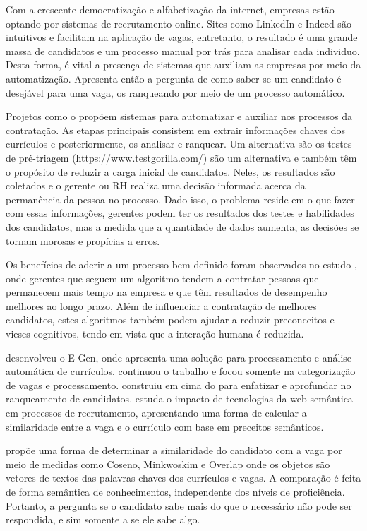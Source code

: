 \documentclass[preprint,12pt]{elsarticle}
\begin{document}
Com a crescente democratização e alfabetização da internet, empresas estão optando por sistemas de recrutamento online. Sites como LinkedIn e Indeed são intuitivos e facilitam na aplicação de vagas, entretanto, o resultado é uma grande massa de candidatos e um processo manual por trás para analisar cada individuo. Desta forma, é vital a presença de sistemas que auxiliam as empresas por meio da automatização. Apresenta então a pergunta de como saber se um candidato é desejável para uma vaga, os ranqueando por meio de um processo automático.

Projetos como o \cite{automatic-profiling-2008, e-gen-job-processing-2007} propõem sistemas para automatizar e auxiliar nos processos da contratação. As etapas principais consistem em extrair informações chaves dos currículos e posteriormente, os analisar e ranquear. Um alternativa são os testes de pré-triagem (https://www.testgorilla.com/) são um alternativa e também têm o propósito de reduzir a carga inicial de candidatos. Neles, os resultados são coletados e o gerente ou RH realiza uma decisão informada acerca da permanência da pessoa no processo. Dado isso, o problema reside em o que fazer com essas informações, gerentes podem ter os resultados dos testes e habilidades dos candidatos, mas a medida que a quantidade de dados aumenta, as decisões se tornam morosas e propícias a erros.

Os benefícios de aderir a um processo bem definido foram observados no estudo \cite{NBERw21709}, onde gerentes que seguem um algoritmo tendem a contratar pessoas que permanecem mais tempo na empresa e que têm resultados de desempenho melhores ao longo prazo. Além de influenciar a contratação de melhores candidatos, estes algoritmos também podem ajudar a reduzir preconceitos e vieses cognitivos, tendo em vista que a interação humana é reduzida. 

\cite{e-gen-job-processing-2007} desenvolveu o E-Gen, onde apresenta uma solução para processamento e análise automática de currículos. \cite{automatic-profiling-2008} continuou o trabalho e focou somente na categorização de vagas e processamento. \cite{improve-ranking-candidates-2009} construiu em cima do \cite{e-gen-job-processing-2007} para enfatizar e aprofundar no ranqueamento de candidatos. \cite{impact-semantic-web-2005} estuda o impacto de tecnologias da web semântica em processos de recrutamento, apresentando uma forma de calcular a similaridade entre a vaga e o currículo com base em preceitos semânticos.

\cite{improve-ranking-candidates-2009} propõe uma forma de determinar a similaridade do candidato com a vaga por meio de medidas como Coseno, Minkwoskim e Overlap onde os objetos são vetores de textos das palavras chaves dos currículos e vagas. A comparação é feita de forma semântica de conhecimentos, independente dos níveis de proficiência. Portanto, a pergunta se o candidato sabe mais do que o necessário não pode ser respondida, e sim somente a se ele sabe algo.
\end{document}
